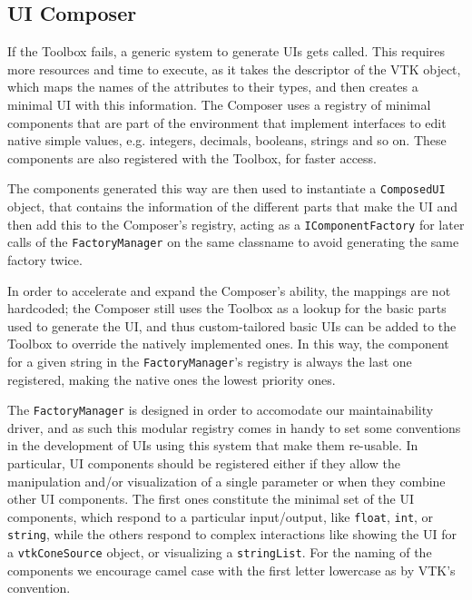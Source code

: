 
\subsection{UI Composer}
\label{sec:design-uicomposer}

If the Toolbox fails, a generic system to generate UIs gets called. This requires more resources and time to execute, as it takes the descriptor of the VTK object, which maps the names of the attributes to their types, and then creates a minimal UI with this information. The Composer uses a registry of minimal components that are part of the environment that implement interfaces to edit native simple values, e.g. integers, decimals, booleans, strings and so on. These components are also registered with the Toolbox, for faster access.

The components generated this way are then used to instantiate a \verb|ComposedUI| object, that contains the information of the different parts that make the UI and then add this to the Composer's registry, acting as a \verb|IComponentFactory| for later calls of the \verb|FactoryManager| on the same classname to avoid generating the same factory twice.

In order to accelerate and expand the Composer's ability, the mappings are not hardcoded; the Composer still uses the Toolbox as a lookup for the basic parts used to generate the UI, and thus custom-tailored basic UIs can be added to the Toolbox to override the natively implemented ones. In this way, the component for a given string in the \verb|FactoryManager|'s registry is always the last one registered, making the native ones the lowest priority ones.

The \verb|FactoryManager| is designed in order to accomodate our maintainability driver, and as such this modular registry comes in handy to set some conventions in the development of UIs using this system that make them re-usable. In particular, UI components should be registered either if they allow the manipulation and/or visualization of a single parameter or when they combine other UI components. The first ones constitute the minimal set of the UI components, which respond to a particular input/output, like \verb|float|, \verb|int|, or \verb|string|, while the others respond to complex interactions like showing the UI for a \verb|vtkConeSource| object, or visualizing a \verb|stringList|. For the naming of the components we encourage camel case with the first letter lowercase as by VTK's convention. 


